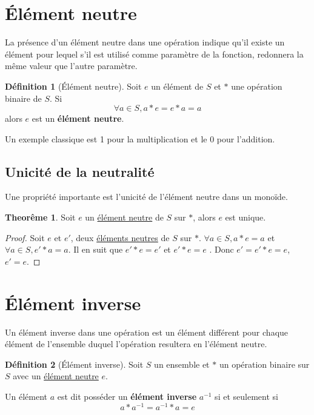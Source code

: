\documentclass[12pt]{book}
\def\sep{\phantom{}}
\theoremstyle{definition}
\newtheorem{definition}{Définition}[section]
\newtheorem{theorem}{Theorême}[section]
\begin{document}
\section{Élément neutre}
La présence d'un élément neutre dans une opération indique qu'il existe un élément pour lequel s'il est utilisé comme 
paramètre de la fonction, redonnera la même valeur que l'autre paramètre. 

\begin{definition}[Élément neutre]
    \label{def:neutre}
    Soit $e$ un élément de $S$ et $\ast$ une opération binaire de $S$. Si $$\forall a \in S, a \ast e = e \ast a = a$$
    alors $e$ est un \textbf{élément neutre}.
\end{definition}
Un exemple classique est 1 pour la multiplication et le 0 pour l'addition.

\subsection{Unicité de la neutralité}
Une propriété importante est l'unicité de l'élément neutre dans un monoïde.
\begin{theorem}
    \label{thm:neutre_unique} Soit $e$ un \hyperref[def:neutre]{élément neutre} de $S$ sur $\ast$, alors $e$ est unique.
\end{theorem}

\begin{proof}
    Soit $e$ et $e'$, deux \hyperref[def:neutre]{éléments neutres} de $S$ sur $\ast$. \sep
    $\forall a \in S, a \ast e = a$ \sep et $\forall a \in S, e' \ast a = a$. \sep
    Il en suit que $e' \ast e = e'$ et $e' \ast e = e$ \sep.
    Donc $e' = e' \ast e = e$, $e' = e$.
\end{proof}
\begin{comment}
    On suppose deux éléments neutres différents afin de prouver qu'il n'existe
    qu'une seule valeur possible et qu'en fait, en bout de ligne $e = e'$. \sep 
    On utilise ici la définiton même de ce qu'est un élément neutre pour $e$. \sep 
    Maintenant, on le fait pour $e'$ \sep 
    On utilise le cas particulier de $a = e$ (puisque c'est $\forall a \in S$) et $a = e'$ \sep 
    On en conclut que $e = e'$ et est donc unique.
\end{comment}

\section{Élément inverse}
Un élément inverse dans une opération est un élément différent pour chaque élément de l'ensemble duquel l'opération 
resultera en l'élément neutre.
\begin{definition}[Élément inverse]
    \label{def:inverse}
    Soit $S$ un ensemble et $\ast$ un opération binaire sur $S$ avec un \hyperref[def:neutre]{élément neutre} $e$.

    Un élément $a$ est dit posséder un \textbf{élément inverse} $a^{-1}$ si et seulement si 
    $$ a \ast a^{-1} = a^{-1} \ast a = e $$
\end{definition}
\end{document}
